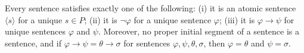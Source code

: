 Every sentence satisfies exactly one of the following:
(i) it is an atomic sentence $\langle s \rangle$ for a unique $s \in P$;
(ii) it is $\neg \varphi$ for a unique sentence $\varphi$;
(iii) it is $\varphi \rightarrow \psi$ for unique sentences $\varphi$ and $\psi$.
Moreover, no proper initial segment of a sentence is a sentence, and if $\varphi \rightarrow \psi = \theta \rightarrow \sigma$ for sentences $\varphi, \psi, \theta, \sigma$, then $\varphi = \theta$ and $\psi = \sigma$.